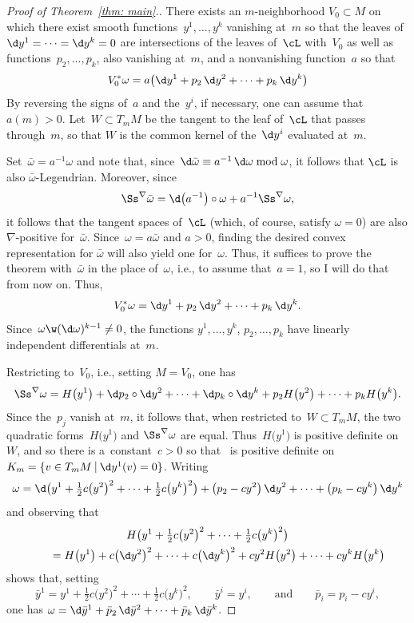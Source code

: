 \begin{proof}[Proof of Theorem~\ref{thm: main}.]
There exists an $m$-neighborhood $V_0\subset M$
on which there exist smooth functions~$y^1,\ldots,y^k$
vanishing at~$m$
so that the leaves of $\d y^1 =\cdots =\d y^k = 0$
are intersections of the leaves of~$\cL$ with~$V_0$
as well as functions~$p_2,\ldots,p_k$, also vanishing
at~$m$, and a nonvanishing function~$a$ so that
\[
V_0^*\omega
= a\bigl(\d y^1 + p_2\,\d y^2 +\cdots + p_k\,\d y^k\bigr)
\]
By reversing the signs of~$a$ and the~$y^i$,
if necessary, one can assume that~$a(m)>0$.
Let~$W\subset T_mM$ be the tangent to the leaf of~$\cL$
that passes through~$m$, so that $W$ is the common kernel
of the~$\d y^i$ evaluated at~$m$.

Set~$\bar\omega = a^{-1}\omega$ and note that,
since~$\d\bar\omega \equiv a^{-1}\,\d\omega \bmod \omega$,
it follows that $\cL$ is also $\bar\omega$-Legendrian.
Moreover, since
\[
\Ss^\nabla\bar\omega = \d\big(a^{-1}\big)\circ\omega + a^{-1} \Ss^\nabla\omega,
\]
it follows that the tangent spaces of~$\cL$
(which, of course, satisfy $\omega=0$)
are also $\nabla$-positive for~$\bar\omega$.
Since~$\omega = a \bar\omega$ and $a>0$,
finding the desired convex representation for $\bar\omega$
will also yield one for~$\omega$.
Thus, it suffices to prove the theorem with~$\bar\omega$
in the place of~$\omega$, i.e., to assume that~$a=1$,
so I will do that from now on. Thus,
\[
V_0^*\omega = \d y^1 + p_2\,\d y^2 +\cdots + p_k\,\d y^k.
\]
Since~$\omega\w(\d\omega)^{k-1}\not=0$, the functions
$y^1,\ldots,y^k$, $p_2,\ldots,p_k$ have linearly independent differentials
at~$m$.

Restricting to~$V_0$, i.e., setting $M=V_0$, one has
\[
\Ss^\nabla\omega = H\big(y^1\big) + \d p_2\circ \d y^2 + \cdots + \d p_k\circ \d y^k
 + p_2 H\big(y^2\big) + \cdots + p_k H\big(y^k\big).
\]
Since the~$p_j$ vanish at~$m$,
it follows that, when restricted to~$W\subset T_mM$,
the two quadratic forms~$H\big(y^1\big)$ and $\Ss^\nabla\omega$ are equal.
Thus~$H\big(y^1\big)$ is positive definite on~$W$,
and so there is a~constant~$c>0$
so that~
is positive definite on~$K_m = \{v\in T_mM\ \vrule\ \d y^1(v) = 0\}$.
Writing
\[
\omega = \d\bigl(y^1 + \tfrac12c \big(y^2\big)^2 + \cdots + \tfrac12c \big(y^k\big)^2\bigr)
 + \big(p_2-c y^2\big)\,\d y^2 + \cdots + \big(p_k-c y^k\big)\,\d y^k
\]
and observing that
\begin{gather*}
H\big(y^1 + \tfrac12c \big(y^2\big)^2 + \cdots + \tfrac12c \big(y^k\big)^2\big)\\
\qquad = H\big(y^1\big) + c \big(\d y^2\big)^2 + \cdots + c \big(\d y^k\big)^2
 + c y^2 H\big(y^2\big) + \cdots + c y^k H\big(y^k\big)
\end{gather*}
shows that, setting
\[
\bar y^1 = y^1 + \tfrac12c \big(y^2\big)^2 + \cdots + \tfrac12c \big(y^k\big)^2,
\qquad
\bar y^i = y^i,
\qquad\text{and}\qquad
\bar p_i = p_i - c y^i,
\]
one has
$\omega = \d\bar y^1
 + \bar p_2\,\d \bar y^2 + \cdots + \bar p_k\,\d \bar y^k$.


\end{proof}

